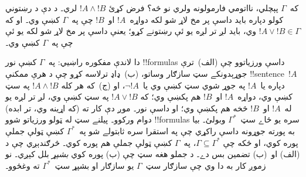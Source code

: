 \documentclass[../../../include/open-logic-section]{subfiles}
\begin{document}
که~$\Gamma$ پېچلي، نااتومي فارمولونه ولري نو څه؟ فرض کړئ
$!A \land !B$ لري۔ د دې د رښتوني کولو دپاره بايد داسې پر مخ لاړ
شو لکه دواړه~$!A$ او~$!B$ چې په~$\Gamma$ کښې وي۔ او که
$!A \lor !B \in \Gamma$ وي، بايد لږ تر لږه يو ئې رښتونے کړو؛
يعنې داسې پر مخ لاړ شو لکه يو ئې چې په~$\Gamma$ کښې وي۔

دا لاندې مفکوره راښيي: په~$\Gamma$ کښې نور !!{formula}s داسې
ورزياتوو چې (الف)~ترې جوړېدونکے سټ سازګار وساتو، (ب)~ډاډ ترلاسه
کړو چې د هرې ممکنې !!{sentence}~$!A$ دپاره يا~$!A$ په
جوړ شوي سټ کښې وي يا~$\lnot !A$، او (ج)~که هر کله
$!A \land !B$ په سټ کښې وي، دواړه~$!A$ او~$!B$ هم پکښې وي؛ که
$!A \lor !B$ په سټ کښې وي، لږ تر لږه يو له~$!A$ او~$!B$ څخه هم
پکښې وي؛ او داسې نور۔ موږ دې کار ته (که اړينه
وي، تر ابده) دوام
ورکوو۔ پيلنے سټ له ټولو ورزياتو شوو !!{formula}s سره يو ځاے سټ~$\Gamma^*$ وبولئ۔
بيا به پورته جوړونه داسې
راکړي چې په استقرا سره ثابتولے شو په~$\Gamma^*$ کښې ټولې جملې
پوره کوي، او ځکه چې $\Gamma \subseteq \Gamma^*$، په~$\Gamma$
کښې ټولې جملې هم پوره کوي۔ څرګندېږي چې د (الف) او~(ب) تضمين بس
دے۔ د جملو هغه سټ چې (ب) پوره کوي \emph{بشپړ} بلل کېږي۔ نو زموږ
کار به دا وي چې سازګار سټ~$\Gamma$ يو سازګار او بشپړ
سټ~$\Gamma^*$ ته وغځوو۔
\end{document}
